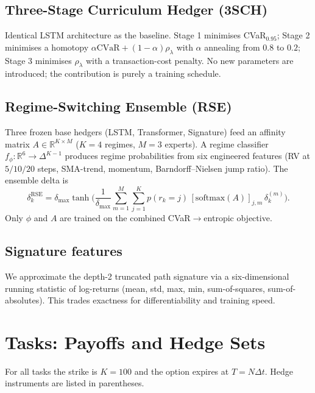 \documentclass[11pt,a4paper]{article}
\newcommand{\R}{\mathbb{R}}
\newcommand{\cvar}{\mathrm{CVaR}}
\begin{document}
\subsection{Three-Stage Curriculum Hedger (3SCH)}
Identical LSTM architecture as the baseline.  Stage 1 minimises
CVaR$_{0.95}$; Stage 2 minimises a homotopy
$\alpha\cvar+(1-\alpha)\rho_\lambda$ with $\alpha$ annealing from
$0.8$ to $0.2$; Stage 3 minimises $\rho_\lambda$ with a transaction-cost
penalty.  No new parameters are introduced; the contribution is purely a
training schedule.

\subsection{Regime-Switching Ensemble (RSE)}
Three frozen base hedgers (LSTM, Transformer, Signature) feed an affinity
matrix $A\in\R^{K\times M}$ ($K=4$ regimes, $M=3$ experts).  A regime
classifier $f_\phi:\R^6\to\Delta^{K-1}$ produces regime probabilities from
six engineered features (RV at $5/10/20$ steps, SMA-trend, momentum,
Barndorff--Nielsen jump ratio).  The ensemble delta is
\begin{equation}
\delta_k^{\mathrm{RSE}} = \delta_{\max}\tanh\!\Big(\frac{1}{\delta_{\max}}\sum_{m=1}^{M}\sum_{j=1}^{K}p(r_k=j)\,[\mathrm{softmax}(A)]_{j,m}\,\delta_k^{(m)}\Big).
\end{equation}
Only $\phi$ and $A$ are trained on the combined CVaR$\to$entropic objective.

\subsection{Signature features}
We approximate the depth-2 truncated path signature
\citep{lyons1998differential,kidger2020signatory} via a six-dimensional
running statistic of log-returns (mean, std, max, min, sum-of-squares,
sum-of-absolutes).  This trades exactness for differentiability and
training speed.

\section{Tasks: Payoffs and Hedge Sets}\label{sec:tasks}

For all tasks the strike is $K=100$ and the option expires at $T = N\Delta t$.
Hedge instruments are listed in parentheses.
\end{document}
